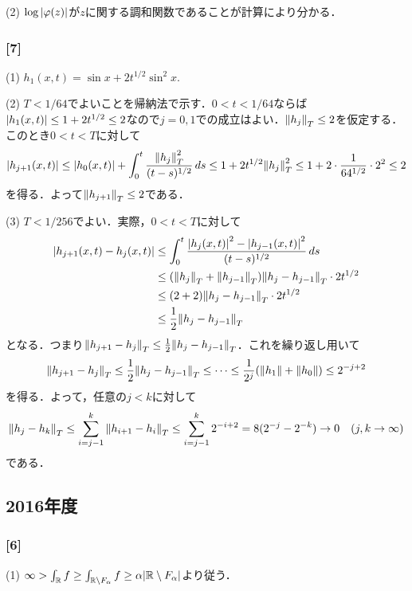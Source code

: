 \documentclass[a4j]{ltjsarticle}
\newcommand{\Rset}{\mathbb{R}}
\newcommand{\1}{\mathbbm{1}}
\numberwithin{equation}{section}
\theoremstyle{definition}
\begin{document}
(2) $\log\abs{\varphi(z)}$が$z$に関する調和関数であることが計算により分かる．

\subsubsection*{[7]}
(1) $h_1(x,t)=\sin x+2t^{1/2}\sin^2 x$.

(2) $T<1/64$でよいことを帰納法で示す．$0<t<1/64$ならば$\abs{h_1(x,t)}\leq 1+2t^{1/2}\leq 2$なので$j=0,1$での成立はよい．$\norm{h_j}_{T}\leq 2$を仮定する．このとき$0<t<T$に対して
\begin{equation}
    \abs{h_{j+1}(x,t)}\leq \abs{h_0(x,t)}+\int_{0}^{t}\frac{\norm{h_j}_{T}^2}{(t-s)^{1/2}}\,ds\leq 1+2t^{1/2}\norm{h_j}_{T}^2\leq 1+2\cdot \frac{1}{64^{1/2}}\cdot 2^2\leq 2 
\end{equation}
を得る．よって$\norm{h_{j+1}}_{T}\leq 2$である．

(3) $T<1/256$でよい．実際，$0<t<T$に対して
\begin{align}
    \abs{h_{j+1}(x,t)-h_{j}(x,t)}&\leq \int_{0}^{t}\frac{\abs{h_{j}(x,t)}^2-\abs{h_{j-1}(x,t)}^2}{(t-s)^{1/2}}\,ds\\
    &\leq (\norm{h_j}_{T}+\norm{h_{j-1}}_{T})\norm{h_{j}-h_{j-1}}_{T}\cdot 2t^{1/2}\\
    &\leq (2+2)\norm{h_{j}-h_{j-1}}_{T}\cdot 2t^{1/2}\\
    &\leq \frac{1}{2}\norm{h_j-h_{j-1}}_{T}
\end{align}
となる．つまり$\norm{h_{j+1}-h_{j}}_{T}\leq \frac{1}{2}\norm{h_j-h_{j-1}}_{T}$．これを繰り返し用いて
\begin{equation}
    \norm{h_{j+1}-h_{j}}_{T}\leq \frac{1}{2}\norm{h_j-h_{j-1}}_{T}\leq \cdots\leq \frac{1}{2^{j}}(\norm{h_1}+\norm{h_0})\leq 2^{-j+2}
\end{equation}
を得る．よって，任意の$j<k$に対して
\begin{equation}
    \norm{h_j-h_{k}}_{T}\leq \sum_{i=j-1}^{k}\norm{h_{i+1}-h_{i}}_{T}\leq \sum_{i=j-1}^{k}2^{-i+2}=8(2^{-j}-2^{-k})\to0\quad (j,k\to\infty)
\end{equation}
である．
\subsection{2016年度}
\subsubsection*{[6]}
(1) $\infty>\int_{\Rset}f\geq \int_{\Rset\setminus F_\alpha}f\geq \alpha\abs{\Rset\setminus F_{\alpha}}$より従う．
\end{document}

